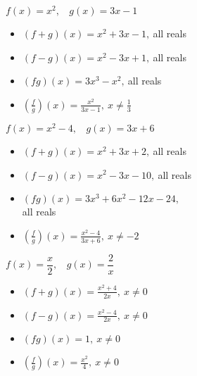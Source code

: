 \documentclass[12pt]{book}
\theoremstyle{definition}
\begin{document}
\begin{oddenumerate}
\item $f(x)=x^2,~~~~g(x)=3x-1$ 
\begin{multicols}{2}
\begin{itemize}
\item  $(f+g)(x)=x^2+3x-1,~$all reals
\item  $(f-g)(x)=x^2-3x+1,~$all reals
\end{itemize}
\end{multicols}
\begin{multicols}{2}
\begin{itemize}
\item  $(fg)(x)=3x^3-x^2,~$all reals
\item  $\left(\frac{f}{g}\right)(x)=\frac{x^2}{3x-1},~x\neq\frac{1}{3}$
\end{itemize}
\end{multicols}
\item $f(x)=x^2-4,~~~~g(x)=3x+6$ 
\begin{multicols}{2}
\begin{itemize}
\item  $(f+g)(x)=x^2+3x+2,~$all reals
\item  $(f-g)(x)=x^2-3x-10,~$all reals
\end{itemize}
\end{multicols}
\begin{multicols}{2}
\begin{itemize}
\item  $(fg)(x)=3x^3+6x^2-12x-24,~$\\all reals
\item  $\left(\frac{f}{g}\right)(x)=\frac{x^2-4}{3x+6},~x\neq -2$
\end{itemize}
\end{multicols}
\newpage
\item $f(x)=\dfrac{x}{2},~~~~g(x)=\dfrac{2}{x}$ 
\begin{multicols}{2}
\begin{itemize}
\item  $(f+g)(x)=\frac{x^2+4}{2x},~x\neq 0$
\item  $(f-g)(x)=\frac{x^2-4}{2x},~x\neq 0$
\end{itemize}
\end{multicols}
\begin{multicols}{2}
\begin{itemize}
\item  $(fg)(x)=1,~x\neq 0$
\item  $\left(\frac{f}{g}\right)(x)=\frac{x^2}{4},~x\neq 0$
\end{itemize}

\end{multicols}
\end{oddenumerate}
\end{document}
